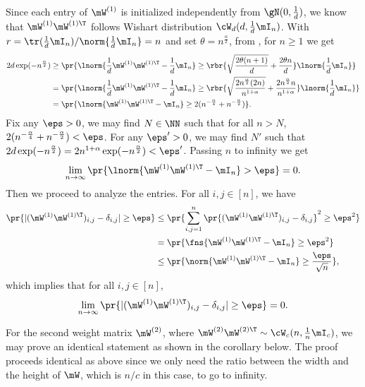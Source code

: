 \begin{proofof}{}
Since each entry of $\mW^{(1)}$ is initialized independently from $\gN(0,\frac1d)$, we know that $\mW^{(1)}\mW^{(1)\T}$ follows Wishart distribution $\cW_d(d, \frac1d \mI_n)$. With $r = \tr(\frac1d\mI_n)/\norm{\frac1d\mI_n} = n$ and set $\theta = n^{\frac{\alpha}{2}}$, from , for $n\geq 1$ we get
\begin{equation}
\begin{split}
2d\exp(-n^{\frac{\alpha}{2}})&\geq \pr{\lnorm{\frac1d\mW^{(1)}\mW^{(1)\T}-\frac1d\mI_n}\geq \rbr{\sqrt{\frac{2\theta(n+1)}{d}}+\frac{2\theta n}{d}}\lnorm{\frac1d\mI_n}}\\
&=\pr{\lnorm{\frac1d\mW^{(1)}\mW^{(1)\T}-\frac1d\mI_n}\geq \rbr{\sqrt{\frac{2n^{\frac{\alpha}{2}}(2n)}{n^{1+\alpha}}}+\frac{2n^{\frac{\alpha}{2}} n}{n^{1+\alpha}}}\lnorm{\frac1d\mI_n}}\\
&=\pr{\lnorm{\mW^{(1)}\mW^{(1)\T}-\mI_n}\geq 2(n^{-\frac\alpha4}+n^{-\frac\alpha2})}.\\
\end{split}
\end{equation}
Fix any $\eps>0$, we may find $N\in \NN$ such that for all $n>N$, $2(n^{-\frac\alpha4}+n^{-\frac\alpha2})<\eps$. For any $\eps'>0$, we may find $N'$ such that $2d\exp(-n^{\frac\alpha2}) = 2n^{1+\alpha}\exp(-n^{\frac\alpha2}) < \eps'$. Passing $n$ to infinity we get
\begin{equation}
    \lim_{n\to\infty}\pr{\lnorm{\mW^{(1)}\mW^{(1)\T}-\mI_n}>\eps} = 0.
\end{equation}
Then we proceed to analyze the entries. For all $i,j\in[n]$, we have
\begin{equation}
\begin{split}
\pr{|(\mW^{(1)}\mW^{(1)\T})_{i,j}-\delta_{i,j}|\geq\eps} &\leq\pr{\sum_{i,j=1}^n\pr{(\mW^{(1)}\mW^{(1)\T})_{i,j}-\delta_{i,j}}^2\geq\eps^2}\\
&=\pr{\fns{\mW^{(1)}\mW^{(1)\T}-\mI_n}\geq\eps^2}\\
&\leq\pr{\norm{\mW^{(1)}\mW^{(1)\T}-\mI_n}\geq\frac{\eps}{\sqrt{n}}},
\end{split}
\end{equation}
which implies that for all $i,j\in[n]$,
\begin{equation}
\lim_{n\to\infty}\pr{|(\mW^{(1)}\mW^{(1)\T})_{i,j}-\delta_{i,j}|\geq\eps}=0.
\end{equation}
\end{proofof}
For the second weight matrix $\mW^{(2)}$, where $\mW^{(2)}\mW^{(2)\T}\sim \cW_c(n, \frac1n\mI_c)$, we may prove an identical statement as shown in the corollary below. The proof proceeds identical as above since we only need the ratio between the width and the height of $\mW$, which is $n/c$ in this case, to go to infinity.

